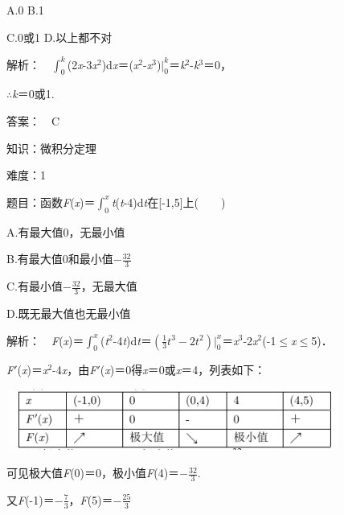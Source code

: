 \documentclass{article} %
\begin{document}
A.0        B.1

C.0或1      D.以上都不对

 解析：　$\int_0^k$(2\textit{x}-3\textit{x}${}^{2}$)d\textit{x}＝(\textit{x}${}^{2}$-\textit{x}${}^{3}$)$|_0^k$＝\textit{k}${}^{2}$-\textit{k}${}^{3}$＝0，

$\mathrm{\therefore}$\textit{k}＝0或1.

 答案：　C



 知识：微积分定理

 难度：1

 题目：函数\textit{F}(\textit{x})＝$\int_0^x$\textit{t}(\textit{t}-4)d\textit{t}在[-1,5]上(　　)

A.有最大值0，无最小值

B.有最大值0和最小值$-\frac{32}{3}$

C.有最小值$-\frac{32}{3}$，无最大值

D.既无最大值也无最小值

 解析：　\textit{F}(\textit{x})＝$\int_0^x$(\textit{t}${}^{2}$-4\textit{t})d\textit{t}＝$(\frac{1}{3}t^3-2t^2)|_0^x$＝\textit{x}${}^{3}$-2\textit{x}${}^{2}$(-1$\mathrm{\le}$\textit{x}$\mathrm{\le}$5)．

\textit{F}$'$(\textit{x})＝\textit{x}${}^{2}$-4\textit{x}，由\textit{F}$'$(\textit{x})＝0得\textit{x}＝0或\textit{x}＝4，列表如下：


\includegraphics*[width=11cm, height=2cm, keepaspectratio=false]{image}

可见极大值\textit{F}(0)＝0，极小值\textit{F}(4)＝$-\frac{32}{3}$.

又\textit{F}(-1)＝$-\frac{7}{3}$，\textit{F}(5)＝$-\frac{25}{3}$
\end{document}
